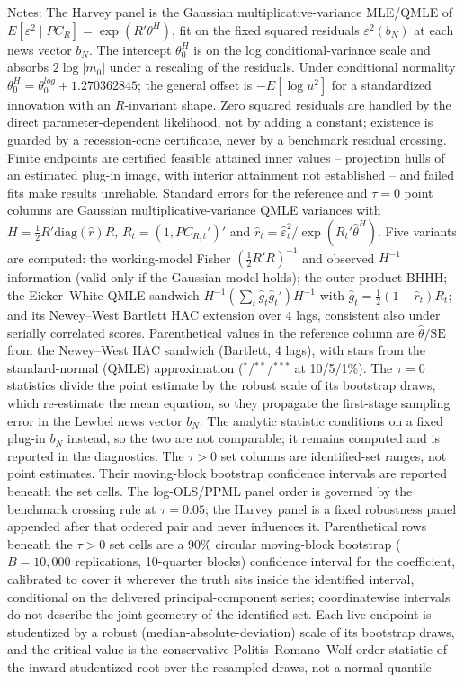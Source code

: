 \documentclass[11pt]{article}
\begin{document}
\begin{table}[!htbp]
\begin{threeparttable}
\begin{tablenotes}[flushleft]
\item Notes: The Harvey panel is the Gaussian multiplicative-variance MLE/QMLE of $E[\varepsilon^2 \mid PC_R] = \exp(R'\theta^{H})$, fit on the fixed squared residuals $\varepsilon^2(b_N)$ at each news vector $b_N$. The intercept $\theta^{H}_0$ is on the log conditional-variance scale and absorbs $2\log|m_0|$ under a rescaling of the residuals. Under conditional normality $\theta^{H}_0 = \theta^{log}_0 + 1.270362845$; the general offset is $-E[\log u^2]$ for a standardized innovation with an $R$-invariant shape. Zero squared residuals are handled by the direct parameter-dependent likelihood, not by adding a constant; existence is guarded by a recession-cone certificate, never by a benchmark residual crossing. Finite endpoints are certified feasible attained inner values -- projection hulls of an estimated plug-in image, with interior attainment not established -- and failed fits make results unreliable. Standard errors for the reference and $\tau{=}0$ point columns are Gaussian multiplicative-variance QMLE variances with $H = \frac{1}{2}R'\mathrm{diag}(\hat r)R$, $R_t = (1, PC_{R,t}')'$ and $\hat r_t = \hat\varepsilon_t^2 / \exp(R_t'\hat\theta^{H})$. Five variants are computed: the working-model Fisher $(\frac{1}{2}R'R)^{-1}$ and observed $H^{-1}$ information (valid only if the Gaussian model holds); the outer-product BHHH; the Eicker--White QMLE sandwich $H^{-1} (\sum_t \hat g_t \hat g_t')H^{-1}$ with $\hat g_t = \frac{1}{2}(1 - \hat r_t)R_t$; and its Newey--West Bartlett HAC extension over 4 lags, consistent also under serially correlated scores. Parenthetical values in the reference column are $\hat\theta/\mathrm{SE}$ from the Newey--West HAC sandwich (Bartlett, 4 lags), with stars from the standard-normal (QMLE) approximation ($^{*}$/$^{**}$/$^{***}$ at 10/5/1\%). The $\tau{=}0$ statistics divide the point estimate by the robust scale of its bootstrap draws, which re-estimate the mean equation, so they propagate the first-stage sampling error in the Lewbel news vector $b_N$. The analytic statistic conditions on a fixed plug-in $b_N$ instead, so the two are not comparable; it remains computed and is reported in the diagnostics. The $\tau{>}0$ set columns are identified-set ranges, not point estimates. Their moving-block bootstrap confidence intervals are reported beneath the set cells. The log-OLS/PPML panel order is governed by the benchmark crossing rule at $\tau{=}0.05$; the Harvey panel is a fixed robustness panel appended after that ordered pair and never influences it. Parenthetical rows beneath the $\tau{>}0$ set cells are a 90\% circular moving-block bootstrap ($B=10{,}000$ replications, 10-quarter blocks) confidence interval for the coefficient, calibrated to cover it wherever the truth sits inside the identified interval, conditional on the delivered principal-component series; coordinatewise intervals do not describe the joint geometry of the identified set. Each live endpoint is studentized by a robust (median-absolute-deviation) scale of its bootstrap draws, and the critical value is the conservative Politis--Romano--Wolf order statistic of the inward studentized root over the resampled draws, not a normal-quantile 
\end{tablenotes}
\end{threeparttable}
\end{table}
\end{document}
